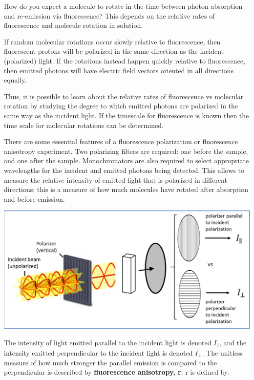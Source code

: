 \documentclass[12pt, letterpaper]{article}
\begin{document}
How do you expect a molecule to rotate in the time between photon absorption and re-emission via fluorescence? This depends on the relative
rates of fluorescence and molecule rotation in solution. 

If random molecular rotations occur slowly relative to fluorescence, then fluorescent protons will be polarized in the same direction as the 
incident (polarized) light. If the rotations instead happen quickly relative to fluorescence, then 
emitted photons will have electric field vectors oriented in all directions equally. 

Thus, it is possible to learn about the relative rates of fluorescence vs molecular rotation by studying the degree to which emitted photons are 
polarized in the same way as the incident light. If the timescale for fluorescence is known then the time scale for molecular rotations can be determined. 

There are some essential features of a fluorescence polarization or fluorescence anisotropy experiment. Two polarizing filters are required: one before the sample, and one after the sample. 
Monochromators are also required to select appropriate wavelengths for the incident and emitted photons being detected. This allows to measure the relative intensity of emitted light that is polarized in 
different directions; this is a measure of how much molecules have rotated after absorption and before emission. 

\begin{center}
    \includegraphics[scale = 0.5]{polarizer.png}
\end{center}

The intensity of light emitted parallel to the incident light is denoted $I_\parallel$, and the intensity emitted perpendicular to the incident light is denoted $I_\perp$. 
The unitless measure of how much stronger the parallel emission is compared to the perpendicular is described by \textbf{fluorescence anisotropy, r}. r is defined by: 
\end{document}
